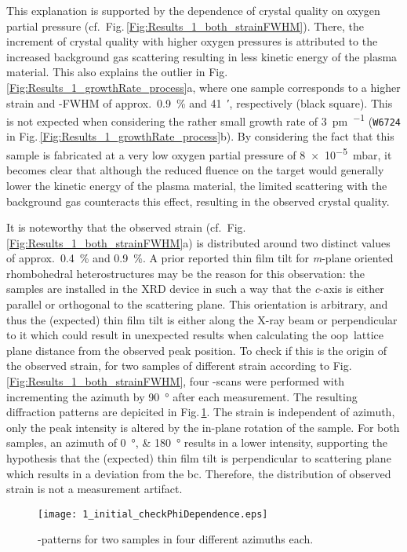This explanation is supported by the dependence of crystal quality on oxygen partial pressure (cf.\ Fig.\,\ref{Fig:Results_1_both_strainFWHM}).
There, the increment of crystal quality with higher oxygen pressures is attributed to the increased background gas scattering resulting in less kinetic energy of the plasma material.
This also explains the outlier in Fig.\,\ref{Fig:Results_1_growthRate_process}a, where one sample corresponds to a higher strain and \textomega-FWHM of approx.\ \qty{0.9}{\percent} and \qty{41}{\arcminute}, respectively (black square).
This is not expected when considering the rather small growth rate of \qty{3}{\pm\per\pulse} (\texttt{W6724} in Fig.\,\ref{Fig:Results_1_growthRate_process}b).
By considering the fact that this sample is fabricated at a very low oxygen partial pressure of \qty{8e-5}{\milli\bar}, it becomes clear that although the reduced fluence on the target would generally lower the kinetic energy of the plasma material, the limited scattering with the background gas counteracts this effect, resulting in the observed crystal quality.

It is noteworthy that the observed strain (cf.\ Fig.\,\ref{Fig:Results_1_both_strainFWHM}a) is distributed around two distinct values of approx.\ \qty{0.4}{\percent} and \qty{0.9}{\percent}.
A prior reported thin film tilt for \textit{m}-plane oriented rhombohedral heterostructures
    \cite{kneiss2021}
may be the reason for this observation:
the samples are installed in the XRD device in such a way that the \textit{c}-axis is either parallel or orthogonal to the scattering plane.
This orientation is arbitrary, and thus the (expected) thin film tilt is either along the X-ray beam or perpendicular to it which could result in unexpected results when calculating the \gls{oop}\ lattice plane distance from the observed peak position.
To check if this is the origin of the observed strain, for two samples of different strain according to Fig.\,\ref{Fig:Results_1_both_strainFWHM}, four \thetaomega-scans were performed with incrementing the azimuth by \qty{90}{\degree} after each measurement.
The resulting diffraction patterns are depicited in Fig.\,\ref{Fig:Results_1_checkPhi}.
The strain is independent of azimuth, only the peak intensity is altered by the in-plane rotation of the sample.
For both samples, an azimuth of \qtylist{0;180}{\degree} results in a lower intensity, supporting the hypothesis that the (expected) thin film tilt is perpendicular to scattering plane which results in a deviation from the \gls{bc}.
Therefore, the distribution of observed strain is not a measurement artifact.
\begin{figure}
    \centering
    \texttt{[image: 1\_initial\_checkPhiDependence.eps]}
    \caption{\thetaomega-patterns for two samples in four different azimuths each.}
    \label{Fig:Results_1_checkPhi}
\end{figure}
